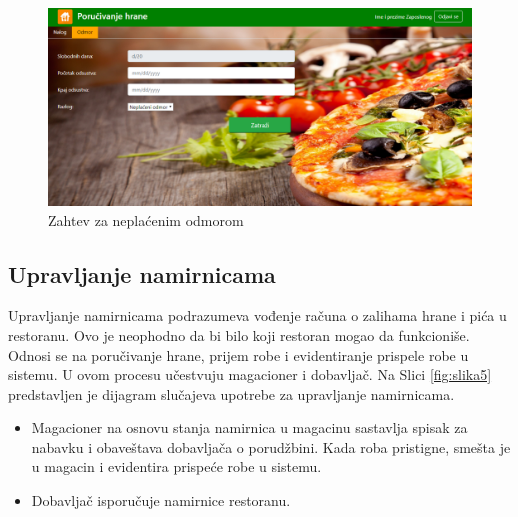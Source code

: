   \begin{figure}[ht]
    \leavevmode
    \begin{center}
    \includegraphics[height=0.3\textheight]{slike/neplaceni_odmor.png}
    \end{center}
    \caption{Zahtev za neplaćenim odmorom} %
    \label{fig:slika_neplaceni}
\end{figure} 
 
 \subsection{Upravljanje namirnicama}
 Upravljanje namirnicama podrazumeva vođenje računa o zalihama hrane i pića u restoranu. Ovo je neophodno da bi bilo koji restoran mogao da funkcioniše. Odnosi se na poručivanje hrane, prijem robe i evidentiranje prispele robe u sistemu. U ovom procesu učestvuju magacioner i dobavljač.
 Na Slici \ref{fig:slika5} predstavljen je dijagram slučajeva upotrebe za upravljanje namirnicama.
 
 \begin{itemize}
     \item Magacioner na osnovu stanja namirnica u magacinu sastavlja spisak za nabavku i obaveštava dobavljača o porudžbini. Kada roba pristigne, smešta je u magacin i evidentira prispeće robe u sistemu.
     \item Dobavljač isporučuje namirnice restoranu.
 \end{itemize}

